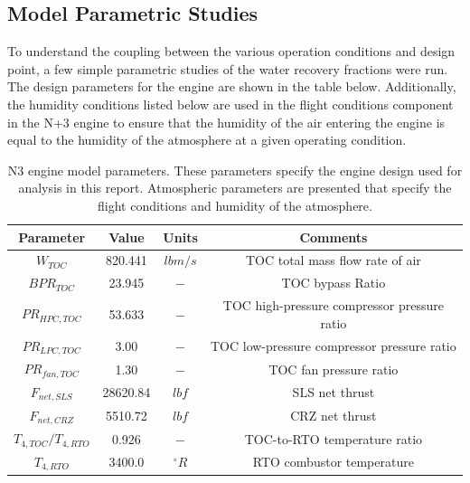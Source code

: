 \documentclass[conf]{new-aiaa}
\begin{document}
\subsection{Model Parametric Studies}
To understand the coupling between the various operation conditions and design point, a few simple parametric studies of the water recovery fractions were run.
The design parameters for the engine are shown in the table below.
Additionally, the humidity conditions listed below are used in the flight conditions component in the N+3 engine to ensure that the humidity of the air entering the engine is equal to the humidity of the atmosphere at a given operating condition.

\begin{table}[H]
    \centering
    \caption{
        N3 engine model parameters.
        These parameters specify the engine design used for analysis in this report.
        Atmospheric parameters are presented that specify the flight conditions and humidity of the atmosphere.}
    \begin{tabular}{|c|c|c|c|}
        \hline
        Parameter             & Value    & Units                 & Comments                                       \\
        \hline
        $W_{TOC}$             & 820.441  & $lbm/s$               & TOC total mass flow rate of air                \\
        $BPR_{TOC}$           & 23.945   & $-$                   & TOC bypass Ratio                               \\
        $PR_{HPC,TOC}$        & 53.633   & $-$                   & TOC high-pressure compressor pressure ratio    \\
        $PR_{LPC,TOC}$        & 3.00     & $-$                   & TOC low-pressure compressor pressure ratio     \\
        $PR_{fan,TOC}$        & 1.30     & $-$                   & TOC fan pressure ratio                         \\
        $F_{net,SLS}$         & 28620.84 & $lbf$                 & SLS net thrust                                 \\
        $F_{net,CRZ}$         & 5510.72  & $lbf$                 & CRZ net thrust                                 \\
        $T_{4,TOC}/T_{4,RTO}$ & 0.926    & $-$                   & TOC-to-RTO temperature ratio                   \\
        $T_{4,RTO}$           & 3400.0   & $^{\circ}R$           & RTO combustor temperature                      \\

\end{tabular}
\end{table}
\end{document}
